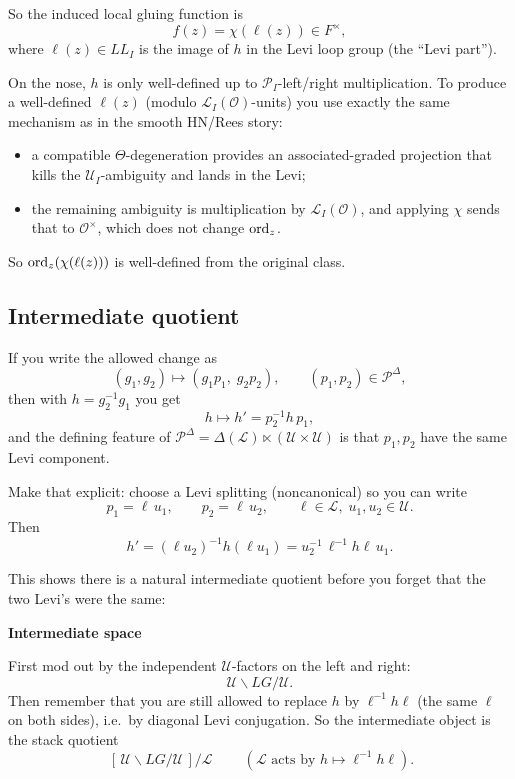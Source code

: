 \documentclass[12pt]{article}
\begin{document}
\begin{remark}
So the induced local gluing function is
\[
f(z)=\chi(\ell(z))\in F^\times,
\]
where $\ell(z)\in LL_I$ is the image of $h$ in the Levi loop group (the ``Levi part'').

On the nose, $h$ is only well-defined up to $\mathcal{P}_I$-left/right multiplication. To produce a well-defined $\ell(z)$ (modulo $\mathcal{L}_I(\mathcal{O})$-units) you use exactly the same mechanism as in the smooth HN/Rees story:
\begin{itemize}
    \item a compatible $\Theta$-degeneration provides an associated-graded projection that kills the $\mathcal{U}_I$-ambiguity and lands in the Levi;
    \item the remaining ambiguity is multiplication by $\mathcal{L}_I(\mathcal{O})$, and applying $\chi$ sends that to $\mathcal{O}^\times$, which does not change $\operatorname{ord}_z$.
\end{itemize}

So $\operatorname{ord}_z(\chi(\ell(z)))$ is well-defined from the original class.


\subsection{Intermediate quotient}
If you write the allowed change as
\[
(g_1,g_2)\mapsto(g_1p_1,\;g_2p_2),\qquad (p_1,p_2)\in \mathcal{P}^\Delta,
\]
then with $h=g_2^{-1}g_1$ you get
\[
h\mapsto h' = p_2^{-1} h\, p_1,
\]
and the defining feature of $\mathcal{P}^\Delta=\Delta(\mathcal{L})\ltimes(\mathcal{U}\times\mathcal{U})$ is that $p_1,p_2$ have the same Levi component.

Make that explicit: choose a Levi splitting (noncanonical) so you can write
\[
p_1=\ell\,u_1,\qquad p_2=\ell\,u_2,\qquad \ell\in \mathcal{L},\;u_1,u_2\in \mathcal{U}.
\]
Then
\[
h' = (\ell u_2)^{-1} h (\ell u_1)=u_2^{-1}\,\ell^{-1}h\ell\,u_1.
\]

This shows there is a natural intermediate quotient before you forget that the two Levi's were the same:

\textbf{Intermediate space}

First mod out by the independent $\mathcal{U}$-factors on the left and right:
\[
\mathcal{U}\backslash LG/\mathcal{U}.
\]
Then remember that you are still allowed to replace $h$ by $\ell^{-1}h\ell$ (the same $\ell$ on both sides), i.e.\ by diagonal Levi conjugation. So the intermediate object is the stack quotient
\[
\boxed{\ [\,\mathcal{U}\backslash LG/\mathcal{U}\,]/\mathcal{L}\ }\qquad(\mathcal{L}\text{ acts by }h\mapsto \ell^{-1}h\ell).
\]


\end{remark}
\end{document}

